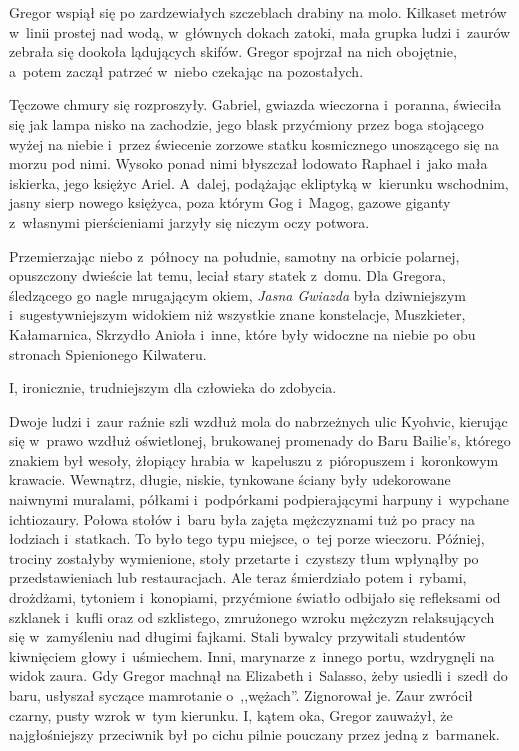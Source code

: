 \documentclass[oneside,polish,12pt,sfheadings]{mwbk}
\begin{document}
Gregor wspiął się po zardzewiałych szczeblach drabiny na molo. Kilkaset
metrów w~linii prostej nad wodą, w~głównych dokach zatoki, mała grupka
ludzi i~zaurów zebrała się dookoła lądujących skifów. Gregor spojrzał na
nich obojętnie, a~potem zaczął patrzeć w~niebo czekając na pozostałych.

Tęczowe chmury się rozproszyły. Gabriel, gwiazda wieczorna i~poranna,
świeciła się jak lampa nisko na zachodzie, jego blask przyćmiony przez
boga stojącego wyżej na niebie i~przez świecenie zorzowe statku
kosmicznego unoszącego się na morzu pod nimi. Wysoko ponad nimi
błyszczał lodowato Raphael i~jako mała iskierka, jego księżyc Ariel. A~dalej, podążając ekliptyką w~kierunku wschodnim, jasny sierp nowego
księżyca, poza którym Gog i~Magog, gazowe giganty z~własnymi
pierścieniami jarzyły się niczym oczy potwora.

Przemierzając niebo z~północy na południe, samotny na orbicie polarnej,
opuszczony dwieście lat temu, leciał stary statek z~domu. Dla Gregora,
śledzącego go nagle mrugającym okiem, \emph{Jasna Gwiazda} była
dziwniejszym i~sugestywniejszym widokiem niż wszystkie znane
konstelacje, Muszkieter, Kałamarnica, Skrzydło Anioła i~inne, które były
widoczne na niebie po obu stronach Spienionego Kilwateru.

I, ironicznie, trudniejszym dla człowieka do zdobycia.

Dwoje ludzi i~zaur raźnie szli wzdłuż mola do nabrzeżnych ulic Kyohvic,
kierując się w~prawo wzdłuż oświetlonej, brukowanej promenady do Baru
Bailie's, którego znakiem był wesoły, żłopiący hrabia w~kapeluszu z~pióropuszem i~koronkowym krawacie. Wewnątrz, długie, niskie, tynkowane
ściany były udekorowane naiwnymi muralami, półkami i~podpórkami
podpierającymi harpuny i~wypchane ichtiozaury. Połowa stołów i~baru była
zajęta mężczyznami tuż po pracy na łodziach i~statkach. To było tego
typu miejsce, o~tej porze wieczoru. Później, trociny zostałyby
wymienione, stoły przetarte i~czystszy tłum wpłynąłby po
przedstawieniach lub restauracjach. Ale teraz śmierdziało potem i~rybami, drożdżami, tytoniem i~konopiami, przyćmione światło odbijało się
refleksami od szklanek i~kufli oraz od szklistego, zmrużonego wzroku
mężczyzn relaksujących się w~zamyśleniu nad długimi fajkami. Stali
bywalcy przywitali studentów kiwnięciem głowy i~uśmiechem. Inni,
marynarze z~innego portu, wzdrygnęli na widok zaura. Gdy Gregor machnął
na Elizabeth i~Salasso, żeby usiedli i~szedł do baru, usłyszał syczące
mamrotanie o~,,wężach''. Zignorował je. Zaur zwrócił czarny, pusty wzrok w~tym kierunku. I, kątem oka, Gregor zauważył, że najgłośniejszy
przeciwnik był po cichu pilnie pouczany przez jedną z~barmanek.
\end{document}
